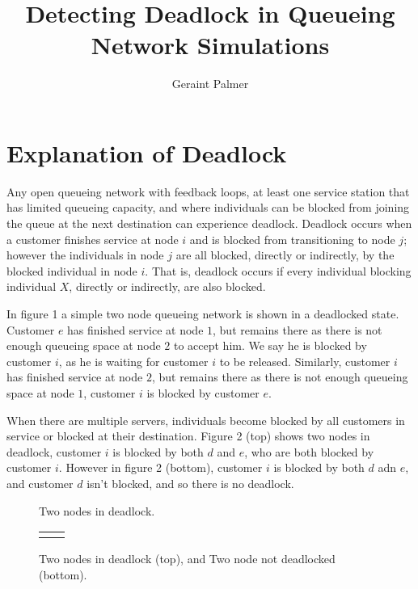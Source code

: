\documentclass{article}
\title{Detecting Deadlock in Queueing Network Simulations}
\author{Geraint Palmer}
\date{}
\begin{document}
\onehalfspacing

\maketitle

\section{Explanation of Deadlock}

Any open queueing network with feedback loops, at least one service station that has limited queueing capacity, and where individuals can be blocked from joining the queue at the next destination can experience deadlock.
Deadlock occurs when a customer finishes service at node $i$ and is blocked from transitioning to node $j$; however the individuals in node $j$ are all blocked, directly or indirectly, by the blocked individual in node $i$.
That is, deadlock occurs if every individual blocking individual $X$, directly or indirectly, are also blocked.\newline

In figure 1 a simple two node queueing network is shown in a deadlocked state.
Customer $e$ has finished service at node $1$, but remains there as there is not enough queueing space at node $2$ to accept him.
We say he is blocked by customer $i$, as he is waiting for customer $i$ to be released.
Similarly, customer $i$ has finished service at node $2$, but remains there as there is not enough queueing space at node $1$, customer $i$ is blocked by customer $e$.\newline

When there are multiple servers, individuals become blocked by all customers in service or blocked at their destination.
Figure 2 (top) shows two nodes in deadlock, customer $i$ is blocked by both $d$ and $e$, who are both blocked by customer $i$.
However in figure 2 (bottom), customer $i$ is blocked by both $d$ adn $e$, and customer $d$ isn't blocked, and so there is no deadlock.\newline

\begin{figure}
  
  \caption{Two nodes in deadlock.}
\end{figure}

\begin{figure}
  \begin{tabular}{c c}
     \\
    \\
    
  \end{tabular}
  \caption{Two nodes in deadlock (top), and Two node not deadlocked (bottom).}
\end{figure}
\end{document}
